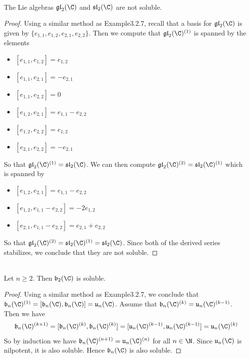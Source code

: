 \documentclass[a4paper]{article}
\begin{document}
\begin{eg}{}{} \\The Lie algebras $\mathfrak{gl}_2(\C)$ and $\mathfrak{sl}_2(\C)$ are not soluble. 
\begin{proof}
Using a similar method as Example3.2.7, recall that a basis for $\mathfrak{gl}_2(\C)$ is given by $\{e_{1,1},e_{1,2},e_{2,1},e_{2,2}\}$. Then we compute that $\mathfrak{gl}_2(\C)^{(1)}$ is spanned by the elements
\begin{itemize}
\item $[e_{1,1},e_{1,2}]=e_{1,2}$
\item $[e_{1,1},e_{2,1}]=-e_{2,1}$
\item $[e_{1,1},e_{2,2}]=0$
\item $[e_{1,2},e_{2,1}]=e_{1,1}-e_{2,2}$
\item $[e_{1,2},e_{2,2}]=e_{1,2}$
\item $[e_{2,1},e_{2,2}]=-e_{2,1}$
\end{itemize}
So that $\mathfrak{gl}_2(\C)^{(1)}=\mathfrak{sl}_2(\C)$. We can then compute $\mathfrak{gl}_2(\C)^{(2)}=\mathfrak{sl}_2(\C)^{(1)}$ which is spanned by 
\begin{itemize}
\item $[e_{1,2},e_{2,1}]=e_{1,1}-e_{2,2}$
\item $[e_{1,2},e_{1,1}-e_{2,2}]=-2e_{1,2}$
\item $[e_{2,1},e_{1,1}-e_{2,2}]=e_{2,1}+e_{2,2}$
\end{itemize}
So that $\mathfrak{gl}_2(\C)^{(2)}=\mathfrak{sl}_2(\C)^{(1)}=\mathfrak{sl}_2(\C)$. Since both of the derived series stabilizes, we conclude that they are not soluble. 
\end{proof}
\end{eg}

\begin{eg}{}{} \\Let $n\geq 2$. Then $\mathfrak{b}_2(\C)$ is soluble. 
\begin{proof}
Using a similar method as Example3.2.7, we conclude that $\mathfrak{b}_n(\C)^{(1)}=[\mathfrak{b}_n(\C),\mathfrak{b}_n(\C)]=\mathfrak{u}_n(\C)$. Assume that $\mathfrak{b}_n(\C)^{(k)}=\mathfrak{u}_n(\C)^{(k-1)}$. Then we have $$\mathfrak{b}_n(\C)^{(k+1)}=[\mathfrak{b}_n(\C)^{(k)},\mathfrak{b}_n(\C)^{(k)}]=[\mathfrak{u}_n(\C)^{(k-1)},\mathfrak{u}_n(\C)^{(k-1)}]=\mathfrak{u}_n(\C)^{(k)}$$ So by induction we have $\mathfrak{b}_n(\C)^{(n+1)}=\mathfrak{u}_n(\C)^{(n)}$ for all $n\in\N$. Since $\mathfrak{u}_n(\C)$ is nilpotent, it is also soluble. Hence $\mathfrak{b}_n(\C)$ is also soluble. 
\end{proof}
\end{eg}
\end{document}
